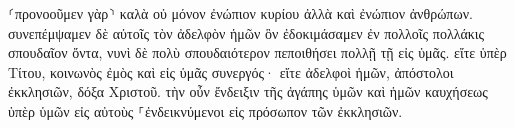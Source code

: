 \documentclass{openreader}
\begin{document}
⸂προνοοῦμεν γὰρ⸃ καλὰ οὐ μόνον ἐνώπιον κυρίου ἀλλὰ καὶ ἐνώπιον ἀνθρώπων. 
συνεπέμψαμεν δὲ αὐτοῖς τὸν ἀδελφὸν ἡμῶν ὃν ἐδοκιμάσαμεν ἐν πολλοῖς πολλάκις σπουδαῖον ὄντα, νυνὶ δὲ πολὺ σπουδαιότερον πεποιθήσει πολλῇ τῇ εἰς ὑμᾶς. 
εἴτε ὑπὲρ Τίτου, κοινωνὸς ἐμὸς καὶ εἰς ὑμᾶς συνεργός· εἴτε ἀδελφοὶ ἡμῶν, ἀπόστολοι ἐκκλησιῶν, δόξα Χριστοῦ. 
τὴν οὖν ἔνδειξιν τῆς ἀγάπης ὑμῶν καὶ ἡμῶν καυχήσεως ὑπὲρ ὑμῶν εἰς αὐτοὺς ⸀ἐνδεικνύμενοι εἰς πρόσωπον τῶν ἐκκλησιῶν. 
\end{document}
